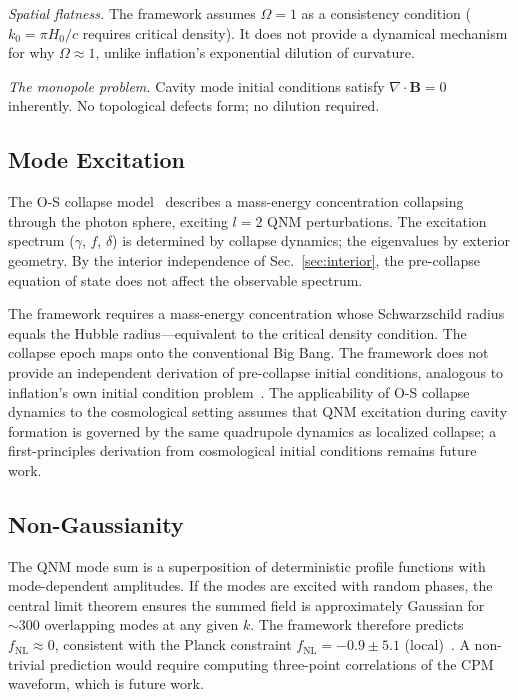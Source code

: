 \documentclass[aps,prd,twocolumn,superscriptaddress,showpacs,preprintnumbers,amsmath,amssymb,nofootinbib]{revtex4-2}
\begin{document}
\emph{Spatial flatness.} The framework assumes $\Omega = 1$ as a consistency condition ($k_0 = \pi H_0/c$ requires critical density). It does not provide a dynamical mechanism for why $\Omega \approx 1$, unlike inflation's exponential dilution of curvature.

\emph{The monopole problem.} Cavity mode initial conditions satisfy $\nabla \cdot \mathbf{B} = 0$ inherently. No topological defects form; no dilution required.


\subsection{Mode Excitation}
\label{sec:excitation}

The O-S collapse model~\cite{OppenheimerSnyder1939} describes a mass-energy concentration collapsing through the photon sphere, exciting $l = 2$ QNM perturbations. The excitation spectrum ($\gamma$, $f$, $\delta$) is determined by collapse dynamics; the eigenvalues by exterior geometry. By the interior independence of Sec.~\ref{sec:interior}, the pre-collapse equation of state does not affect the observable spectrum.

The framework requires a mass-energy concentration whose Schwarzschild radius equals the Hubble radius---equivalent to the critical density condition. The collapse epoch maps onto the conventional Big Bang. The framework does not provide an independent derivation of pre-collapse initial conditions, analogous to inflation's own initial condition problem~\cite{Ijjas2013,Brandenberger2014}. The applicability of O-S collapse dynamics to the cosmological setting assumes that QNM excitation during cavity formation is governed by the same quadrupole dynamics as localized collapse; a first-principles derivation from cosmological initial conditions remains future work.


\subsection{Non-Gaussianity}
\label{sec:fnl}

The QNM mode sum is a superposition of deterministic profile functions with mode-dependent amplitudes. If the modes are excited with random phases, the central limit theorem ensures the summed field is approximately Gaussian for $\sim 300$ overlapping modes at any given $k$. The framework therefore predicts $f_\mathrm{NL} \approx 0$, consistent with the Planck constraint $f_\mathrm{NL} = -0.9 \pm 5.1$ (local)~\cite{Planck2020}. A non-trivial prediction would require computing three-point correlations of the CPM waveform, which is future work.
\end{document}
